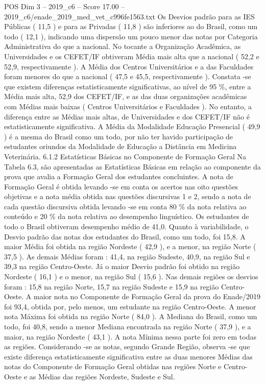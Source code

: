 \begin{textsample}{POS Dim 3 – 2019\_c6 – Score 17.00 – 2019\_c6/enade\_2019\_med\_vet\_c996fe1563.txt}
Os Desvios padrão para as IES Públicas ( 11,5 ) e para as Privadas ( 11,8 ) são inferiores ao do Brasil, como um todo ( 12,1 ), indicando uma dispersão um pouco menor das notas por Categoria Administrativa do que a nacional.
No tocante a Organização Acadêmica, as Universidades e os CEFET/IF obtiveram Média mais alta que a nacional ( 52,2 e 52,9, respectivamente ).
A Média dos Centros Universitários e a das Faculdades foram menores do que a nacional ( 47,5 e 45,5, respectivamente ).
Constata -se que existem diferenças estatisticamente significativas, ao nível de 95 \%, entre a Média mais alta, 52,9 dos CEFET/IF, e as das duas organizações acadêmicas com Médias mais baixas ( Centros Universitários e Faculdades ).
No entanto, a diferença entre as Médias mais altas, de Universidades e dos CEFET/IF não é estatisticamente significativa.
A Média da Modalidade Educação Presencial ( 49,9 ) é a mesma do Brasil como um todo, por não ter havido participação de estudantes oriundos da Modalidade de Educação a Distância em Medicina Veterinária. 6.1.2 Estatísticas Básicas no Componente de Formação Geral Na Tabela 6.3, são apresentadas as Estatísticas Básicas em relação ao componente da prova que avalia a Formação Geral dos estudantes concluintes.
A nota de Formação Geral é obtida levando -se em conta os acertos nas oito questões objetivas e a nota média obtida nas questões discursivas 1 e 2, sendo a nota de cada questão discursiva obtida levando -se em conta 80 \% da nota relativa ao conteúdo e 20 \% da nota relativa ao desempenho linguístico.
Os estudantes de todo o Brasil obtiveram desempenho médio de 41,0.
Quanto à variabilidade, o Desvio padrão das notas dos estudantes do Brasil, como um todo, foi 15,8.
A maior Média foi obtida na região Nordeste ( 42,9 ), e a menor, na região Norte ( 37,5 ).
As demais Médias foram : 41,4, na região Sudeste, 40,9, na região Sul e 39,3 na região Centro-Oeste.
Já o maior Desvio padrão foi obtido na região Nordeste ( 16,1 ) e o menor, na região Sul ( 15,6 ).
Nas demais regiões os desvios foram : 15,8 na região Norte, 15,7 na região Sudeste e 15,9 na região Centro-Oeste.
A maior nota no Componente de Formação Geral da prova do Enade/2019 foi 93,4, obtida por, pelo menos, um estudante na região Centro-Oeste.
A menor nota Máxima foi obtida na região Norte ( 84,0 ).
A Mediana do Brasil, como um todo, foi 40,8, sendo a menor Mediana encontrada na região Norte ( 37,9 ), e a maior, na região Nordeste ( 43,1 ).
A nota Mínima nessa parte foi zero em todas as regiões.
Considerando -se as notas, segundo Grande Região, observa -se que existe diferença estatisticamente significativa entre as duas menores Médias das notas do Componente de Formação Geral obtidas nas regiões Norte e Centro-Oeste e as Médias das regiões Nordeste, Sudeste e Sul.

\end{textsample}
